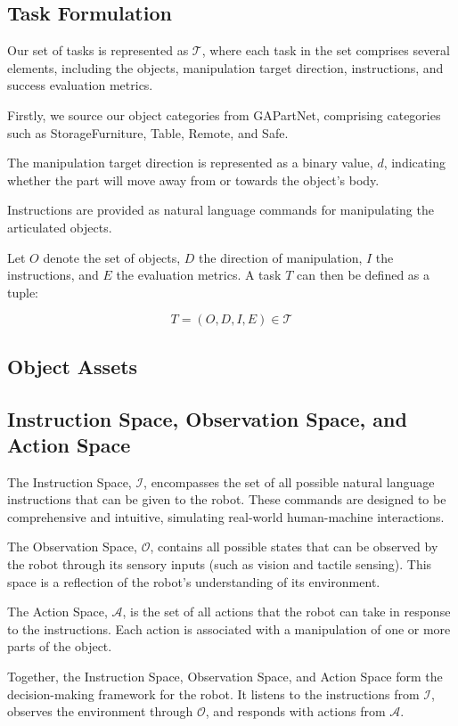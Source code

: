 \documentclass{article}
\begin{document}
\subsection{Task Formulation}
Our set of tasks is represented as $\mathcal{T}$, where each task in the set comprises several elements, including the objects, manipulation target direction, instructions, and success evaluation metrics.

Firstly, we source our object categories from GAPartNet\cite{geng2022gapartnet}, comprising  categories such as StorageFurniture, Table, Remote, and Safe.

The manipulation target direction is represented as a binary value, $d$, indicating whether the part will move away from or towards the object's body.

Instructions are provided as natural language commands for manipulating the articulated objects.

Let $O$ denote the set of objects, $D$ the direction of manipulation, $I$ the instructions, and $E$ the evaluation metrics. A task $T$ can then be defined as a tuple:

$$T=(O,D,I,E)\in \mathcal{T}$$

\subsection{Object Assets}

\subsection{Instruction Space, Observation Space, and Action Space}
The Instruction Space, $\mathcal{I}$, encompasses the set of all possible natural language instructions that can be given to the robot. These commands are designed to be comprehensive and intuitive, simulating real-world human-machine interactions.

The Observation Space, $\mathcal{O}$, contains all possible states that can be observed by the robot through its sensory inputs (such as vision and tactile sensing). This space is a reflection of the robot's understanding of its environment.

The Action Space, $\mathcal{A}$, is the set of all actions that the robot can take in response to the instructions. Each action is associated with a manipulation of one or more parts of the object.

Together, the Instruction Space, Observation Space, and Action Space form the decision-making framework for the robot. It listens to the instructions from $\mathcal{I}$, observes the environment through $\mathcal{O}$, and responds with actions from $\mathcal{A}$.
\end{document}
